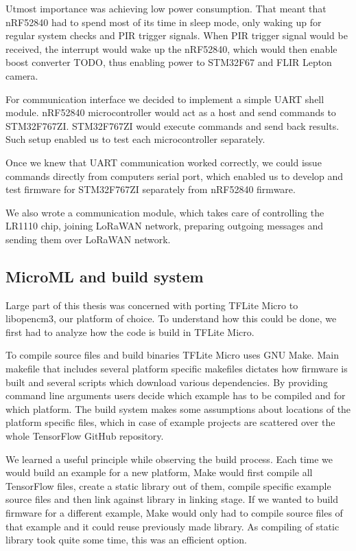 Utmost importance was achieving low power consumption.
That meant that nRF52840 had to spend most of its time in sleep mode, only waking up for regular system checks and PIR trigger signals.
When PIR trigger signal would be received, the interrupt would wake up the nRF52840, which would then enable boost converter TODO, thus enabling power to STM32F67 and FLIR Lepton camera.

For communication interface we decided to implement a simple UART shell module.
nRF52840 microcontroller would act as a host and send commands to STM32F767ZI.
STM32F767ZI would execute commands and send back results.
Such setup enabled us to test each microcontroller separately.

Once we knew that UART communication worked correctly, we could issue commands directly from computers serial port, which enabled us to develop and test firmware for STM32F767ZI separately from nRF52840 firmware.

We also wrote a communication module, which takes care of controlling the LR1110 chip, joining LoRaWAN network, preparing outgoing messages and sending them over LoRaWAN network.


\subsection{ MicroML and build system} \label{build_system_label}

Large part of this thesis was concerned with porting TFLite Micro to libopencm3, our platform of choice.
To understand how this could be done, we first had to analyze how the code is build in TFLite Micro.

To compile source files and build binaries TFLite Micro uses GNU Make.
Main makefile that includes several platform specific makefiles dictates how firmware is built and several scripts which download various dependencies.
By providing command line arguments users decide which example has to be compiled and for which platform.
The build system makes some assumptions about locations of the platform specific files, which in case of example projects are scattered over the whole TensorFlow GitHub repository.

We learned a useful principle while observing the build process. 
Each time we would build an example for a new platform, Make would first compile all TensorFlow files, create a static library out of them, compile specific example source files and then link against library in linking stage.
If we wanted to build firmware for a different example, Make would only had to compile source files of that example and it could reuse previously made library.
As compiling of static library took quite some time, this was an efficient option.

